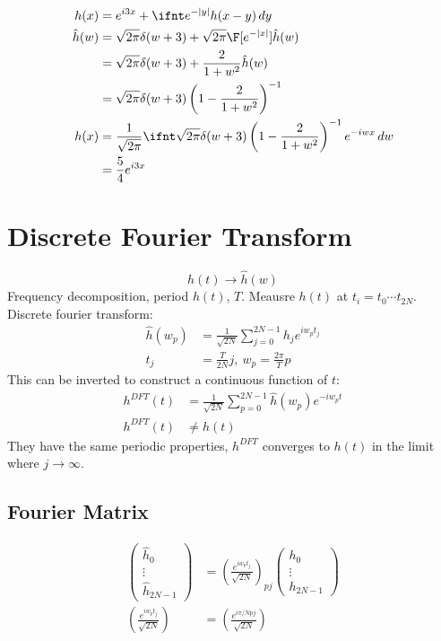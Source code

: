 \documentclass[cplx.tex]{subfiles}
\begin{document}
\begin{example}
\begin{align}
    h(x) &= e^{i3x} + \ifnt e^{-|y|}h(x-y)\,dy \\
    \hat{h}(w) &= \sqrt{2\pi}\delta(w+3) + \sqrt{2\pi}\F[e^{-|x|}]\hat{h}(w) \\
               &= \sqrt{2\pi}\delta(w+3) + \frac{2}{1+w^2}\hat{h}(w) \\
               &= \sqrt{2\pi}\delta(w+3) \left(1 - \frac{2}{1+w^2}\right)^{-1} \\
    h(x) &= \frac{1}{\sqrt{2\pi}} \ifnt \sqrt{2\pi} \delta(w+3) \left(1 - \frac{2}{1+w^2}\right)^{-1} e^{-iwx}\, dw \\
         &= \frac{5}{4}e^{i3x}
\end{align}
\end{example}

\section{Discrete Fourier Transform}
\begin{equation}
    h(t) \to \hat{h}(w)
\end{equation}
Frequency decomposition, period $h(t)$, $T$.
Meausre $h(t)$ at $t_i = t_0\cdots t_{2N}$.
Discrete fourier transform:
\begin{align}
    \hat{h}(w_p) &= \frac{1}{\sqrt{2N}} \sum_{j=0}^{2N-1} h_je^{iw_pt_j} \\
    t_j &= \frac{T}{2N}j,~ w_p = \frac{2\pi}{T}p
\end{align}
This can be inverted to construct a continuous function of $t$:
\begin{align}
    h^{DFT}(t) &= \frac{1}{\sqrt{2N}} \sum_{p=0}^{2N-1} \hat{h}(w_p)e^{-iw_pt} \\
    h^{DFT}(t) &\neq h(t)
\end{align}
They have the same periodic properties, $h^{DFT}$ converges to $h(t)$ in the limit where $j\to\infty$.

\subsection{Fourier Matrix}
\begin{align}
    \begin{pmatrix} \hat{h}_0 \\ \vdots \\ \hat{h}_{2N-1} \end{pmatrix} &= \left(\frac{e^{iw_pt_j}}{\sqrt{2N}}\right)_{pj}\begin{pmatrix} h_0 \\ \vdots \\ h_{2N-1}\end{pmatrix} \\
    \left(\frac{e^{iw_pt_j}}{\sqrt{2N}}\right) &= \left(\frac{e^{i\pi/N pj}}{\sqrt{2N}}\right)
\end{align}
\end{document}
